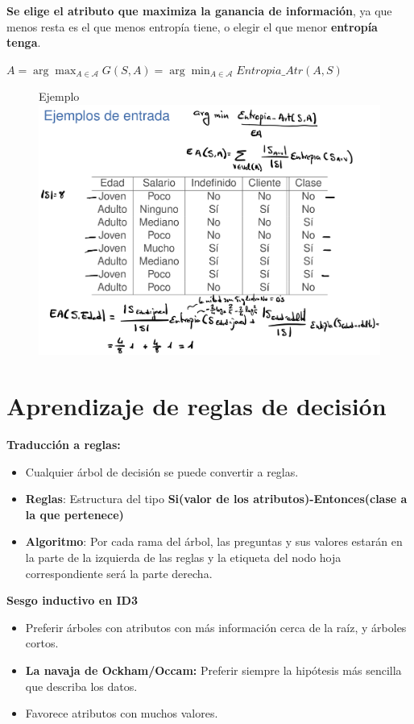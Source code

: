 \documentclass[12pt, twoside, openright]{report} %
\begin{document}
\textbf{Se elige el atributo que maximiza la ganancia de información},
ya que menos resta es el que menos entropía tiene, o elegir el que menor
\textbf{entropía tenga}.

\(A= \arg\max_{A \in \mathcal{A}} G(S,A) = \arg\min_{A \in \mathcal{A}} Entropia \_ Atr(A,S)\)


\begin{figure}[H]
	Ejemplo
	{\includegraphics[scale=.1]{Untitled 10.png}}
\end{figure}


\section{Aprendizaje de reglas de
  decisión}

\textbf{Traducción a reglas:}

\begin{itemize}
	\item Cualquier árbol de decisión se puede convertir a reglas.
	\item \textbf{Reglas}: Estructura del tipo \textbf{Si(valor de los
		      atributos)-Entonces(clase a la que pertenece)}
	\item \textbf{Algoritmo}: Por cada rama del árbol, las preguntas y sus
	      valores estarán en la parte de la izquierda de las reglas y la
	      etiqueta del nodo hoja correspondiente será la parte derecha.
\end{itemize}

\textbf{Sesgo inductivo en ID3}

\begin{itemize}
	\item Preferir árboles con atributos con más información cerca de la raíz, y
	      árboles cortos.
	\item \textbf{La navaja de Ockham/Occam:} Preferir siempre la hipótesis más
	      sencilla que describa los datos.
	\item Favorece atributos con muchos valores.
\end{itemize}
\end{document}
